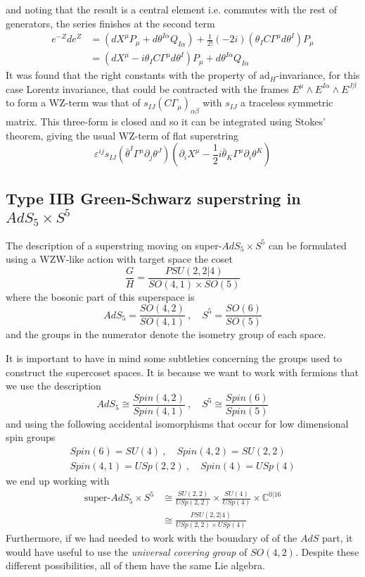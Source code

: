 \documentclass[a4paper,12pt]{article}
\numberwithin{equation}{section}
\numberwithin{thm}{section}
\numberwithin{exm}{section}
\newcommand{\p}{\partial}
\newcommand{\ad}{\mathrm{ad}}
\newcommand{\C}{{\mathbb C}}
\newcommand{\we}{{\wedge}}
\newcommand{\ads}{{AdS_5\times S^5}}
\newcommand{\<}{{\langle}}
\renewcommand{\>}{{\rangle}}
\renewcommand{\a}{{\alpha}}
\renewcommand{\b}{{\beta}}
\newcommand{\ve}{{\varepsilon}}
\newcommand{\G}{{\Gamma}}
\newcommand{\m}{{\mu}}
\renewcommand{\t}{{\theta}}
\newcommand{\tb}{{\bar\theta}}
\begin{document}
and noting that the result is a central element i.e. commutes with the rest of generators, the series finishes at the second term
	\begin{align}
	e^{-Z}d e^Z & = (dX^\m P_\m + d\t^{I\a} Q_{I\a}) + \frac{1}{2!} (-2i)(\t_{I}C \G^\m d\t^{I}) P_\m \nonumber \\
	& = (dX^\m - i \t_I C \G^\m d\t^I) P_\m + d\t^{I\a} Q_{I\a}
	\end{align}
%
%
It was found that the right constants with the property of $\ad_H$-invariance, for this case Lorentz invariance, that could be contracted with the frames $E^\m\we E^{I\a}\we E^{J\b}$ to form a WZ-term was that of $s_{IJ}(C\G_\m)_{\a\b}$ with $s_{IJ}$ a traceless symmetric matrix. This three-form is closed and so it can be integrated using Stokes' theorem, giving the usual WZ-term of flat superstring
	\begin{equation}
	\ve^{ij} s_{IJ} (\tb^{I}\G^\m\p_j\t^J)(\p_i X^\mu - \frac{1}{2}i\tb_K\G^\m \p_i\t^K)
	\end{equation}


\subsection{Type IIB Green-Schwarz superstring in $\ads$}
The description of a superstring moving on super-$\ads$ can be formulated using a WZW-like action with target space the coset
	\begin{equation}
	\frac{G}{H} = \frac{PSU(2,2|4)}{SO(4,1)\times SO(5)}
	\end{equation}
where the bosonic part of this superspace is
	\begin{equation}
	AdS_5 = \frac{SO(4,2)}{SO(4,1)}\ ,\quad S^5 = \frac{SO(6)}{SO(5)}
	\end{equation}
and the groups in the numerator denote the isometry group of each space.

It is important to have in mind some subtleties concerning the groups used to construct the supercoset spaces. It is because we want to work with fermions that we use the description %
	\begin{equation}
	AdS_5 \cong \frac{Spin(4,2)}{Spin(4,1)}\ ,\quad S^5 \cong \frac{Spin(6)}{Spin(5)}
	\end{equation}
and using the following accidental isomorphisms that occur for low dimensional spin groups
	\begin{align}
	Spin(6) = SU(4)\ ,\quad Spin(4,2) = SU(2,2) \\
	Spin(4,1) = USp(2,2)\ ,\quad Spin (4) = USp(4)
	\end{align}
we end up working with
	\begin{align}
	\text{super-}\ads & \cong \frac{SU(2,2)}{USp(2,2)} \times \frac{SU(4)}{USp(4)}\times \C^{0|16} \\
	& \cong \frac{PSU(2,2|4)}{USp(2,2)\times USp(4)}
	\end{align}
Furthermore, if we had needed to work with the boundary of of the $AdS$ part, it would have useful to use the {\it universal covering group} of $SO(4,2)$. Despite these different possibilities, all of them have the same Lie algebra.
\end{document}
